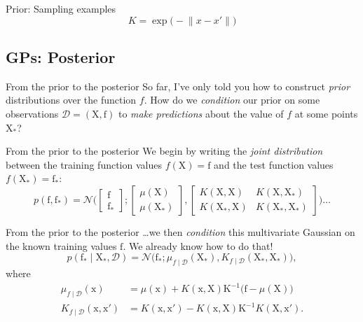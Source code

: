 \documentclass[xcolor={dvipsnames},hyperref={breaklinks=true},12pt]{beamer}
\newcommand{\given}{\mid}
\newcommand{\mc}[1]{\mathcal{#1}}
\newcommand{\data}{\mc{D}}
\newcommand{\inv}{^{-1}}
\newcommand{\mat}[1]{\bm{\mathrm{#1}}}
\renewcommand{\vec}[1]{\bm{\mathrm{#1}}}
\newcommand{\emphr}[1]{{\textcolor{or}{\itshape #1}}}
\begin{document}
\begin{frame}{Prior: Sampling examples}
  \hspace*{-1.5em}
  \begin{equation*}
    K = \exp\bigl(-\lVert x - x' \rVert\bigr)
  \end{equation*}
\end{frame}

\subsection{GPs: Posterior}

\begin{frame}{From the prior to the posterior}
  So far, I've only told you how to construct \emphr{prior}
  distributions over the function $f$.  How do we \emphr{condition}
  our prior on some observations $\data = (\mat{X}, \vec{f})$ to
  \emphr{make predictions} about the value of $f$ at some points
  $\mat{X}_\ast$?
\end{frame}

\begin{frame}{From the prior to the posterior}
  We begin by writing the \emphr{joint distribution} between the
  training function values $f(\mat{X}) = \vec{f}$ and the test function
  values $f(\mat{X}_\ast) = \vec{f}_\ast$:
  \begin{equation*}
    p(\vec{f}, \vec{f}_\ast) =
    \mc{N}\Biggl(
    \begin{bmatrix} \vec{f} \\ \vec{f}_\ast \end{bmatrix};
    \begin{bmatrix} \mu(\mat{X}) \\ \mu(\mat{X}_\ast) \end{bmatrix},
    \begin{bmatrix} K(\mat{X}, \mat{X}) & K(\mat{X}, \mat{X}_\ast) \\ K(\mat{X}_\ast, \mat{X}) & K(\mat{X}_\ast, \mat{X}_\ast) \end{bmatrix}
    \Biggl)\dotsc
  \end{equation*}
\end{frame}

\begin{frame}{From the prior to the posterior}
  \dots we then \emphr{condition} this multivariate Gaussian on the known
  training values $\vec{f}$.  We already know how to do that!
  \begin{equation*}
    p(\vec{f}_\ast \given \mat{X}_\ast, \data) =
    \mc{N}
    \bigl(
    \vec{f}_\ast;
    \mu_{f \given \data}(\mat{X}_\ast)
    ,
    K_{f \given \data}(\mat{X}_\ast, \mat{X}_\ast)
    \bigr),
  \end{equation*}
  where
  \begin{align*}
    \mu_{f \given \data}(\vec{x})
    &=
    \mu(\vec{x}) +
    K(\vec{x}, \mat{X})
    \mat{K}\inv
    \bigl(\vec{f} - \mu(\mat{X})\bigr)
    \\
    K_{f \given \data}(\vec{x}, \vec{x}')
    &=
    K(\vec{x}, \vec{x}')
    -
    K(\vec{x}, \mat{X})
    \mat{K}\inv
    K(\mat{X}, \vec{x}').
  \end{align*}
\end{frame}
\end{document}
